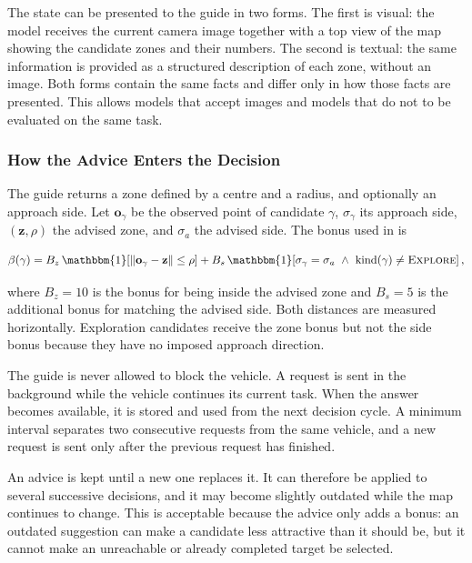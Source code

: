 \FloatBarrier

The state can be presented to the guide in two forms. The first is visual: the
model receives the current camera image together with a top view of the map
showing the candidate zones and their numbers. The second is textual: the same
information is provided as a structured description of each zone, without an
image. Both forms contain the same facts and differ only in how those facts are
presented. This allows models that accept images and models that do not to be
evaluated on the same task.

\subsubsection*{How the Advice Enters the Decision}

The guide returns a zone defined by a centre and a radius, and optionally an
approach side. Let $\mathbf{o}_\gamma$ be the observed point of candidate
$\gamma$, $\sigma_\gamma$ its approach side, $(\mathbf{z},\rho)$ the advised
zone, and $\sigma_a$ the advised side. The bonus used in  is

\begin{equation}
    \beta(\gamma)
    =
    B_z\,
    \mathbbm{1}\!\left[
        \lVert \mathbf{o}_\gamma-\mathbf{z}\rVert \leq \rho
        \right]
    +
    B_s\,
    \mathbbm{1}\!\left[
        \sigma_\gamma=\sigma_a
        \ \wedge\
        \operatorname{kind}(\gamma)\neq\textsc{Explore}
        \right],
    \label{eq:sys:guide-bonus}
\end{equation}

where $B_z = 10$ is the bonus for being inside the advised zone and $B_s = 5$ is
the additional bonus for matching the advised side. Both distances are measured
horizontally. Exploration candidates receive the zone bonus but not the side
bonus because they have no imposed approach direction.

The guide is never allowed to block the vehicle. A request is sent in the
background while the vehicle continues its current task. When the answer becomes
available, it is stored and used from the next decision cycle. A minimum interval
separates two consecutive requests from the same vehicle, and a new request is
sent only after the previous request has finished.

An advice is kept until a new one replaces it. It can therefore be applied to
several successive decisions, and it may become slightly outdated while the map
continues to change. This is acceptable because the advice only adds a bonus: an
outdated suggestion can make a candidate less attractive than it should be, but
it cannot make an unreachable or already completed target be selected.

